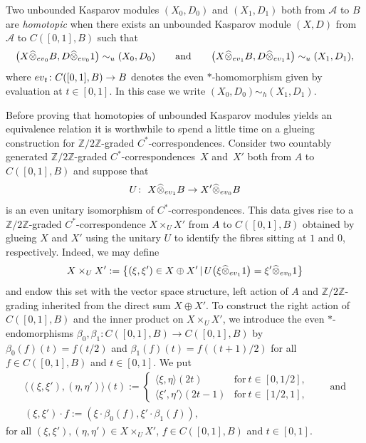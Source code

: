 \documentclass[11pt]{article}
\numberwithin{equation}{section}
\newcommand{\cd}{\cdot}
\newcommand{\hot}{\widehat \otimes}
\newcommand{\op}{\oplus}
\newcommand{\ti}{\times}
\newcommand{\zz}{\mathbb{Z}}
\newcommand{\be}{\beta}
\newcommand{\s}[1]{\mathscr{#1}}
\newcommand{\inn}[1]{\langle #1 \rangle}
\begin{document}
\begin{dfn}
Two unbounded Kasparov modules $(X_0,D_0)$ and $(X_1,D_1)$ both from $\s A$ to $B$ are \emph{homotopic} when there exists an unbounded Kasparov module $(X,D)$ from $\s A$ to $C([0,1],B)$ such that
\[
\big(X \hot_{{\rm ev}_0} B,D \hot_{{\rm ev}_0} 1\big) \sim_u (X_0,D_0) \qquad \mbox{and} \qquad \big(X \hot_{{\rm ev}_1} B,D \hot_{{\rm ev}_1} 1\big) \sim_u (X_1,D_1) ,
\]
where ${\rm ev}_t\colon C( [0,1],B) \to B$ denotes the even $*$-homomorphism given by evaluation at $t \in [0,1]$. In this case we write $(X_0,D_0) \sim_h (X_1,D_1)$.
\end{dfn}

Before proving that homotopies of unbounded Kasparov modules yields an equivalence relation it is worthwhile to spend a little time on a glueing construction for $\zz/2\zz$-graded $C^*$-correspondences. Consider two countably generated $\zz/2\zz$-graded $C^*$-correspondences~$X$ and~$X'$ both from $A$ to $C([0,1],B)$ and suppose that
\[
U\colon \ X \hot_{{\rm ev}_1} B \to X' \hot_{{\rm ev}_0} B
\]
is an even unitary isomorphism of $C^*$-correspondences. This data gives rise to a $\zz/2\zz$-graded $C^*$-correspondence $X \ti_U X'$ from $A$ to $C([0,1],B)$ obtained by glueing $X$ and $X'$ using the unitary $U$ to identify the fibres sitting at $1$ and $0$, respectively. Indeed, we may define
\[
X \ti_U X' := \big\{ (\xi,\xi') \in X \op X' \,|\, U\big( \xi \hot_{{\rm ev}_1} 1 \big) = \xi' \hot_{{\rm ev}_0} 1 \big\}
\]
and endow this set with the vector space structure, left action of $A$ and $\zz/2\zz$-grading inherited from the direct sum $X \op X'$. To construct the right action of $C([0,1],B)$ and the inner product on $X \ti_U X'$, we introduce the even $*$-endomorphisms $\be_0 , \be_1\colon C( [0,1],B) \to C([0,1],B)$ by $\be_0(f)(t) = f(t/2)$ and $\be_1(f)(t) = f( (t + 1)/2)$ for all $f \in C([0,1],B)$ and $t \in [0,1]$. We put
\begin{gather*}
\inn{ (\xi,\xi'), (\eta,\eta')}(t) :=
\begin{cases} \inn{\xi,\eta}(2t) & \text{for} \ t \in [0,1/2], \\
\inn{\xi',\eta'}(2t - 1) & \text{for} \ t \in [1/2,1],
\end{cases} \qquad \text{and} \\
(\xi,\xi') \cd f := (\xi \cd \be_0(f),\xi' \cd \be_1(f)) ,
\end{gather*}
for all $(\xi,\xi'), (\eta,\eta') \in X \ti_U X'$, $f \in C([0,1],B)$ and $t \in [0,1]$.
\end{document}
